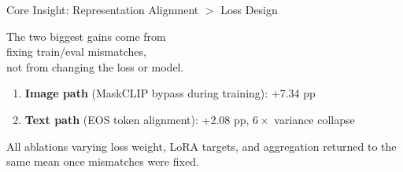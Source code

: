 \documentclass[aspectratio=169,12pt]{beamer}
\newcommand{\plus}[1]{{\color{positive}+#1}}
\begin{document}
\begin{frame}{Core Insight: Representation Alignment $>$ Loss Design}
  \begin{center}
    \Large
    The two biggest gains come from\\
    \alert{fixing train/eval mismatches},\\
    not from changing the loss or model.
  \end{center}

  \vspace{1em}
  \begin{enumerate}
    \item \textbf{Image path} (MaskCLIP bypass during training): \plus{7.34 pp}
    \item \textbf{Text path} (EOS token alignment): \plus{2.08 pp}, $6\times$ variance collapse
  \end{enumerate}

  \vspace{0.5em}
  {\small \color{muted} All ablations varying loss weight, LoRA targets, and aggregation returned to the same mean once mismatches were fixed.}
\end{frame}
\end{document}
